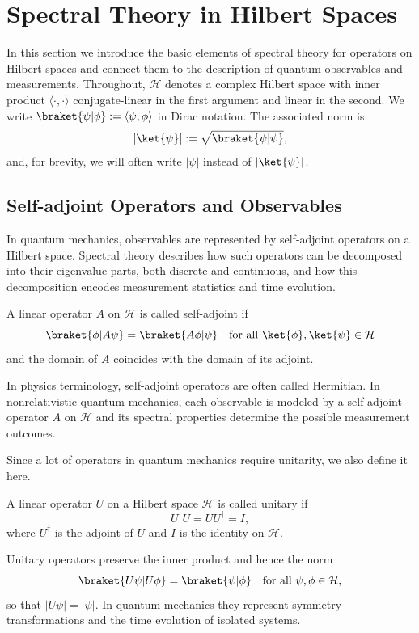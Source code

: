 \section{Spectral Theory in Hilbert Spaces}\label{sec:spectral_theory_in_hilbert_spaces}
In this section we introduce the basic elements of spectral theory for operators on Hilbert spaces and connect them to the description of quantum observables and measurements. Throughout, $\mathcal{H}$ denotes a complex Hilbert space with inner product $\langle\cdot,\cdot\rangle$ conjugate-linear in the first argument and linear in the second. We write $\braket{\psi|\phi}:=\langle\psi,\phi\rangle$ in Dirac notation. The associated norm is
\begin{equation}
\lvert\ket{\psi}\rvert := \sqrt{\braket{\psi|\psi}},
\end{equation}
and, for brevity, we will often write $\lvert\psi\rvert$ instead of $\lvert\ket{\psi}\rvert$.
\subsection{Self-adjoint Operators and Observables}\label{sec:self_adjoint_operators_and_observables}
In quantum mechanics, observables are represented by self-adjoint operators on a Hilbert space. Spectral theory describes how such operators can be decomposed into their eigenvalue parts, both discrete and continuous, and how this decomposition encodes measurement statistics and time evolution.
\begin{definition}
A linear operator $A$ on $\mathcal{H}$ is called self-adjoint if
\begin{equation}
\braket{\phi|A\psi}=\braket{A\phi|\psi}\quad\text{for all }\ket{\phi},\ket{\psi}\in\mathcal{H}
\end{equation}
and the domain of $A$ coincides with the domain of its adjoint.
\end{definition}
In physics terminology, self-adjoint operators are often called Hermitian. In nonrelativistic quantum mechanics, each observable is modeled by a self-adjoint operator $A$ on $\mathcal{H}$ and its spectral properties determine the possible measurement outcomes.

Since a lot of operators in quantum mechanics require unitarity, we also define it here.
\begin{definition}
A linear operator $U$ on a Hilbert space $\mathcal{H}$ is called unitary if
\begin{equation}
U^\dagger U=U U^\dagger=I,
\end{equation}
where $U^\dagger$ is the adjoint of $U$ and $I$ is the identity on $\mathcal{H}$.
\end{definition}
Unitary operators preserve the inner product and hence the norm
\begin{equation}
\braket{U\psi\vert U\phi}=\braket{\psi\vert\phi}\quad\text{for all }\psi,\phi\in\mathcal{H},
\end{equation}
so that $\lvert U\psi\rvert=\lvert\psi\rvert$. In quantum mechanics they represent symmetry
transformations and the time evolution of isolated systems.

